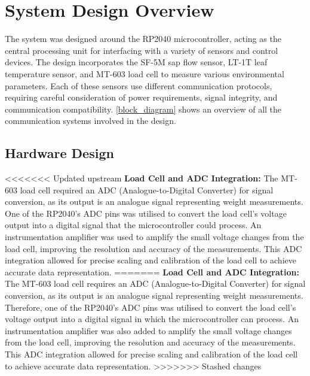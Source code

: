 
\section{System Design Overview}

The system was designed around the RP2040 microcontroller, acting as the central 
processing unit for interfacing with a variety of sensors and control devices. 
The design incorporates the SF-5M sap flow sensor, LT-1T leaf temperature sensor, 
and MT-603 load cell to measure various environmental parameters. Each of these 
sensors use different communication protocols, requiring careful consideration of 
power requirements, signal integrity, and communication compatibility. \cref{block_diagram} 
shows an overview of all the communication systems involved in the design.

\subsection{Hardware Design}
<<<<<<< Updated upstream
\textbf{Load Cell and ADC Integration:} The MT-603 load cell required an ADC (Analogue-to-Digital Converter) for signal conversion, as its output is an analogue signal representing weight measurements. One of the RP2040's ADC pins was utilised to convert the load cell's voltage output into a digital signal that the microcontroller could process. An instrumentation amplifier was used to amplify the small voltage changes from the load cell, improving the resolution and accuracy of the measurements. This ADC integration allowed for precise scaling and calibration of the load cell to achieve accurate data representation.
=======
\textbf{Load Cell and ADC Integration:} The MT-603 load cell requires an ADC 
(Analogue-to-Digital Converter) for signal conversion, as its output is an analogue 
signal representing weight measurements. Therefore, one of the RP2040's ADC pins was utilised 
to convert the load cell's voltage output into a digital signal in which the microcontroller 
can process. An instrumentation amplifier was also added to amplify the small voltage changes 
from the load cell, improving the resolution and accuracy of the measurements. This ADC 
integration allowed for precise scaling and calibration of the load cell to achieve 
accurate data representation.
>>>>>>> Stashed changes

